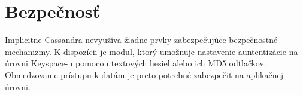 \documentclass[11pt,twoside,a4paper]{book}
\begin{document}
\section{Bezpečnosť}

Implicitne Cassandra nevyužíva žiadne prvky zabezpečujúce bezpečnostné mechanizmy. K dispozícii je modul, ktorý umožnuje nastavenie auntentizácie na úrovni Keyspace-u pomocou textových hesiel alebo ich MD5 odtlačkov. Obmedzovanie prístupu k datám je preto potrebné zabezpečiť na aplikačnej úrovni.




% 
% 
% 
% 
% 
% 
% 
% 
% 
% 
% 
% 
% 
% 
\end{document}
